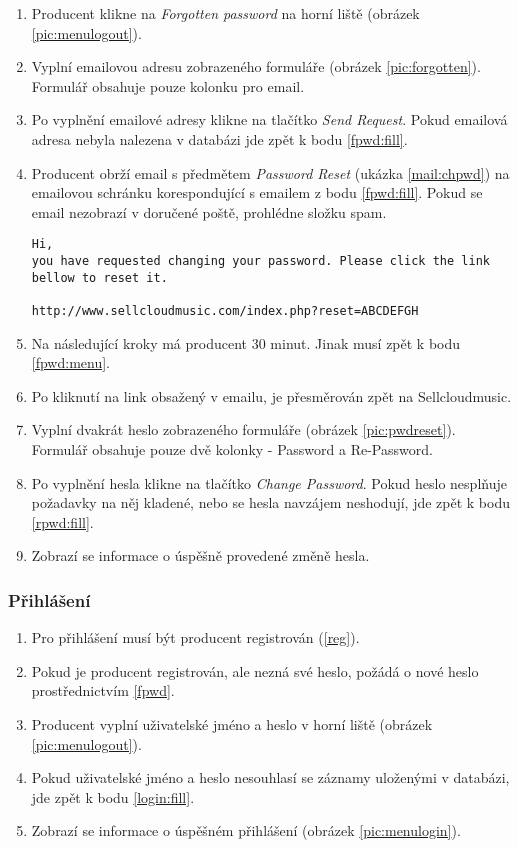 \documentclass[12pt]{article}
\begin{document}
\begin{enumerate}
\item \label{fpwd:menu}Producent klikne na \emph{Forgotten password} na horní liště (obrázek \ref{pic:menulogout}).
\item \label{fpwd:fill} Vyplní emailovou adresu zobrazeného formuláře (obrázek \ref{pic:forgotten}). Formulář obsahuje pouze kolonku pro email.
\item Po vyplnění emailové adresy klikne na tlačítko \emph{Send Request}. Pokud emailová adresa nebyla nalezena v databázi jde zpět k bodu \ref{fpwd:fill}.
\item Producent obrží email s předmětem \emph{Password Reset} (ukázka \ref{mail:chpwd}) na emailovou schránku korespondující s emailem z bodu \ref{fpwd:fill}. Pokud se email nezobrazí v doručené poště, prohlédne složku spam.

\renewcommand{\lstlistingname}{Ukázka}
\lstset{language=HTML}
\begin{lstlisting}[caption={Email o změně hesla},label={mail:chpwd}]
Hi,
you have requested changing your password. Please click the link
bellow to reset it.

http://www.sellcloudmusic.com/index.php?reset=ABCDEFGH
\end{lstlisting}

\item Na následující kroky má producent 30 minut. Jinak musí zpět k bodu \ref{fpwd:menu}.
\item Po kliknutí na link obsažený v emailu, je přesměrován zpět na Sellcloudmusic.
\item \label{rpwd:fill} Vyplní dvakrát heslo zobrazeného formuláře (obrázek \ref{pic:pwdreset}). Formulář obsahuje pouze dvě kolonky - {Password} a {Re-Password}.
\item Po vyplnění hesla klikne na tlačítko \emph{Change Password}. Pokud heslo nesplňuje požadavky na něj kladené, nebo se hesla navzájem neshodují, jde zpět k bodu \ref{rpwd:fill}.
\item Zobrazí se informace o úspěšně provedené změně hesla.
\end{enumerate}

\subsubsection{Přihlášení}

\begin{enumerate}
\item Pro přihlášení musí být producent registrován (\ref{reg}).
\item Pokud je producent registrován, ale nezná své heslo, požádá o nové heslo prostřednictvím \ref{fpwd}.
\item \label{login:fill} Producent vyplní uživatelské jméno a heslo v horní liště (obrázek \ref{pic:menulogout}).
\item Pokud uživatelské jméno a heslo nesouhlasí se záznamy uloženými v databázi, jde zpět k bodu \ref{login:fill}.
\item Zobrazí se informace o úspěšném přihlášení (obrázek \ref{pic:menulogin}).
\end{enumerate}
\end{document}
